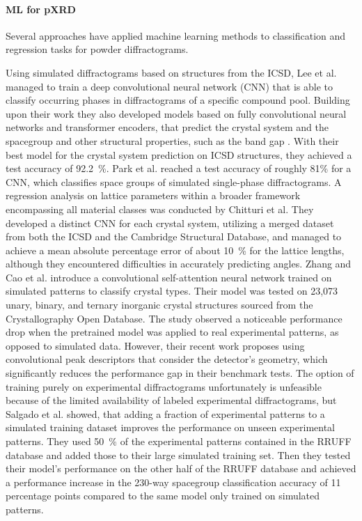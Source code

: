 \paragraph{ML for pXRD} Several approaches have applied machine learning methods to classification and regression tasks for powder diffractograms.

Using simulated diffractograms based on structures from the ICSD, Lee et al. managed to train a deep convolutional neural network (CNN) that is able to classify occurring phases in diffractograms of a specific compound pool. \cite{Lee2020} Building upon their work they also developed models based on fully convolutional neural networks and transformer encoders, that predict the crystal system and the spacegroup and other structural properties, such as the band gap \cite{Lee2022}. With their best model for the crystal system prediction on ICSD structures, they achieved a test accuracy of \SI{92.2}{\percent}.
Park et al. reached a test accuracy of roughly 81\% for a CNN, which classifies space groups of simulated single-phase diffractograms. \cite{Park2017}
A regression analysis on lattice parameters within a broader framework encompassing all material classes was conducted by Chitturi et al.\cite{Chitturi2021} They developed a distinct CNN for each crystal system, utilizing a merged dataset from both the ICSD and the Cambridge Structural Database, and managed to achieve a mean absolute percentage error of about \SI{10}{\percent} for the lattice lengths, although they encountered difficulties in accurately predicting angles. Zhang and Cao et al.\cite{zhang2024crystallographic} introduce a convolutional self-attention neural network trained on simulated patterns to classify crystal types. Their model was tested on 23,073 unary, binary, and ternary inorganic crystal structures sourced from the Crystallography Open Database. The study observed a noticeable performance drop when the pretrained model was applied to real experimental patterns, as opposed to simulated data. However, their recent work \cite{cao2024simxrd} proposes using convolutional peak descriptors that consider the detector's geometry, which significantly reduces the performance gap in their benchmark tests.
The option of training purely on experimental diffractograms unfortunately is unfeasible because of the limited availability of labeled experimental diffractograms, but Salgado et al. \cite{Salgado2023} showed, that adding a fraction of experimental patterns to a simulated training dataset improves the performance on unseen experimental patterns. They used \SI{50}{\percent} of the experimental patterns contained in the RRUFF database and added those to their large simulated training set. Then they tested their model's performance on the other half of the RRUFF database and achieved a performance increase in the 230-way spacegroup classification accuracy of \num{11} percentage points compared to the same model only trained on simulated patterns.

